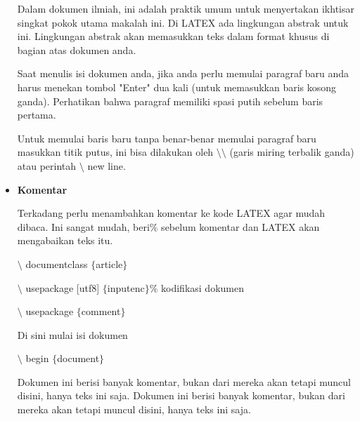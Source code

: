 \begin{itemize}
Dalam dokumen ilmiah, ini adalah praktik umum untuk menyertakan ikhtisar singkat pokok utama makalah ini. Di LATEX ada lingkungan abstrak untuk ini. Lingkungan abstrak akan memasukkan teks dalam format khusus di bagian atas dokumen anda.\par

Saat menulis isi dokumen anda, jika anda perlu memulai paragraf baru anda harus menekan tombol "Enter" dua kali (untuk memasukkan baris kosong ganda). Perhatikan bahwa paragraf memiliki spasi putih sebelum baris pertama.\par

Untuk memulai baris baru tanpa benar-benar memulai paragraf baru masukkan titik putus, ini bisa dilakukan oleh $\setminus$$\setminus$ (garis miring terbalik ganda) atau perintah $\setminus$ new line.\par

\vspace{10pt}
	\item {\fontsize{14pt}{14pt}\selectfont \textbf{Komentar}}\par

Terkadang perlu menambahkan komentar ke kode LATEX agar mudah dibaca. Ini sangat mudah, beri$\%$ sebelum komentar dan LATEX akan mengabaikan teks itu.\par

\hspace*{0.5in}$\setminus$ documentclass $ \{ $article$ \} $\par

\hspace*{0.5in}$\setminus$ usepackage [utf8] $ \{ $inputenc$ \} $$\%$ kodifikasi dokumen\par

\hspace*{0.5in}$\setminus$ usepackage $ \{ $comment$ \} $\par

\hspace*{0.5in}Di sini mulai isi dokumen\par

\hspace*{0.5in}$\setminus$ begin $ \{ $document$ \} $\par

\hspace*{0.5in}Dokumen ini berisi banyak komentar, bukan dari mereka akan tetapi muncul disini, hanya \hspace*{0.5in}teks ini saja. Dokumen ini berisi banyak komentar, bukan dari mereka akan tetapi muncul \hspace*{0.5in}disini, hanya teks ini saja.\par


\end{itemize}
